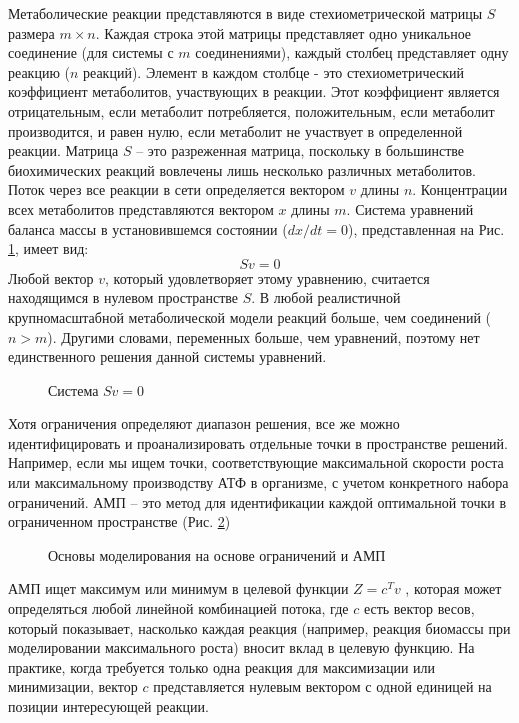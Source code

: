 \documentclass[a4paper, 12pt]{article}
\begin{document}
Метаболические реакции представляются в виде стехиометрической матрицы $S$ размера $m \times n$. Каждая строка этой матрицы представляет одно уникальное соединение (для системы с $m$ соединениями), каждый столбец представляет одну реакцию ($n$ реакций). Элемент в каждом столбце - это стехиометрический коэффициент метаболитов, участвующих в реакции. Этот коэффициент является отрицательным, если метаболит потребляется, положительным, если метаболит производится, и равен нулю, если метаболит не участвует в определенной реакции. Матрица $S$ – это разреженная матрица, поскольку в большинстве биохимических реакций вовлечены лишь несколько различных метаболитов. Поток через все реакции в сети определяется вектором $v$ длины $n$. Концентрации всех метаболитов представляются вектором $x$ длины $m$. Система уравнений баланса массы в установившемся состоянии ($dx/dt =0$), представленная на Рис. \ref{fig:1_c}, имеет вид:
$$
Sv=0
$$
Любой вектор $v$, который удовлетворяет этому уравнению, считается находящимся в нулевом пространстве $S$. В любой реалистичной крупномасштабной метаболической модели реакций больше, чем соединений ($n>m$). Другими словами, переменных больше, чем уравнений, поэтому нет единственного решения данной системы уравнений.

\begin{figure}[h]
    \caption{Система $Sv=0$}
    \label{fig:1_c}
\end{figure}

Хотя ограничения определяют диапазон решения, все же можно идентифицировать и проанализировать отдельные точки в пространстве решений. Например, если мы ищем точки, соответствующие максимальной скорости роста или максимальному производству АТФ в организме, с учетом конкретного набора ограничений. АМП – это метод для идентификации каждой оптимальной точки в ограниченном пространстве (Рис. \ref{fig:2})

\begin{figure}[h]
    \caption{Основы моделирования на основе ограничений и АМП}
    \label{fig:2}
\end{figure}

АМП ищет максимум или минимум в целевой функции $Z=c^Tv$ , которая может определяться любой линейной комбинацией потока, где $c$ есть вектор весов, который показывает, насколько каждая реакция (например, реакция биомассы при моделировании максимального роста) вносит вклад в целевую функцию.  На практике, когда требуется только одна реакция для максимизации или минимизации, вектор $c$ представляется нулевым вектором с одной единицей на позиции интересующей реакции.
\end{document}
